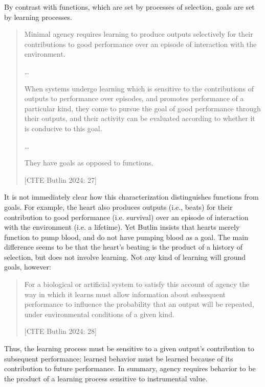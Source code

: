By contrast with functions, which are set by processes of selection, goals are set by learning processes.
\begin{quote}
	Minimal agency requires learning to produce outputs selectively for their contributions to good performance over an episode of interaction with the environment.

	\dots

	When systems undergo learning which is sensitive to the contributions of outputs to performance over episodes, and promotes performance of a particular kind, they come to pursue the goal of good performance through their outputs, and their activity can be evaluated according to whether it is conducive to this goal.

	\dots

	They have goals as opposed to functions.

	\hfill [CITE Butlin 2024: 27]
\end{quote}
It is not immediately clear how this characterization distinguishes functions from goals.
For example, the heart also produces outputs (i.e., beats) for their contribution to good performance (i.e. survival) over an episode of interaction with the environment (i.e. a lifetime).
Yet Butlin insists that hearts merely function to pump blood, and do not have pumping blood as a goal.
The main difference seems to be that the heart's beating is the product of a history of selection, but does not involve learning.
Not any kind of learning will ground goals, however:
\begin{quote}
	For a biological or artificial system to satisfy this account of agency the way in which it learns must allow information about subsequent performance to influence the probability that an output will be repeated, under environmental conditions of a given kind.

	\hfill [CITE Butlin 2024: 28]
\end{quote}
Thus, the learning process must be sensitive to a given output's contribution to subsequent performance: learned behavior must be learned because of its contribution to future performance.
In summary, agency requires behavior to be the product of a learning process sensitive to instrumental value.


